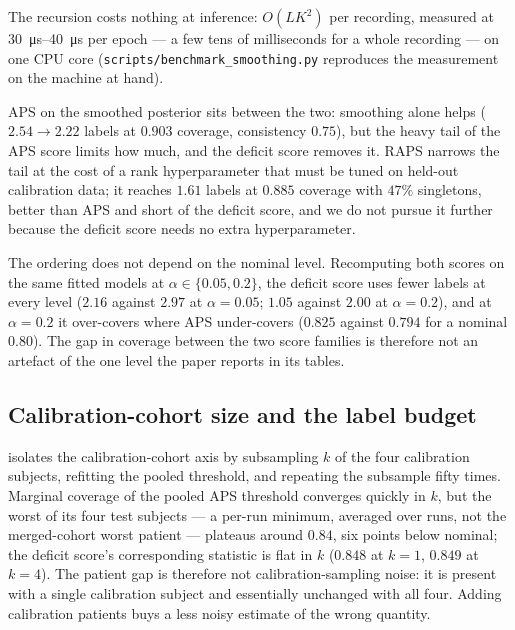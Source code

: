 

The recursion costs nothing at
inference: $O(LK^2)$ per recording, measured at
\SIrange{30}{40}{\micro\second} per epoch --- a few tens of milliseconds for
a whole recording --- on one CPU core (\texttt{scripts/benchmark\_smoothing.py}
reproduces the measurement on the machine at hand).

APS on the smoothed posterior sits between the two: smoothing alone helps
($2.54\to2.22$ labels at $0.903$ coverage, consistency $0.75$),
but the heavy tail of the APS score limits how much, and the deficit score
removes it. RAPS narrows the tail at the cost of a rank hyperparameter that
must be tuned on held-out calibration data; it reaches $1.61$ labels at
$0.885$ coverage with $47\%$ singletons, better than APS and short of the
deficit score, and we do not pursue it further because the deficit score needs
no extra hyperparameter.

The ordering does not depend on the nominal level. Recomputing both scores on
the same fitted models at $\alpha\in\{0.05,0.2\}$, the deficit score uses
fewer labels at every level ($2.16$ against $2.97$ at $\alpha=0.05$; $1.05$
against $2.00$ at $\alpha=0.2$), and at $\alpha=0.2$ it over-covers where APS
under-covers ($0.825$ against $0.794$ for a nominal $0.80$). The gap in
coverage between the two score families is therefore not an artefact of the
one level the paper reports in its tables.

\subsection{Calibration-cohort size and the label budget}
\label{sec:results-cohort-size}

 isolates the calibration-cohort axis by subsampling
$k$ of the four calibration subjects, refitting the pooled threshold, and
repeating the subsample fifty times. Marginal coverage of the pooled APS
threshold converges quickly in $k$, but the worst of its four test subjects
--- a per-run minimum, averaged over runs, not the merged-cohort worst
patient --- plateaus around $0.84$, six points below nominal; the deficit
score's corresponding statistic is flat in $k$ ($0.848$ at $k=1$, $0.849$ at
$k=4$). The patient gap is therefore not calibration-sampling noise: it is
present with a single calibration subject and essentially unchanged with all
four. Adding calibration patients buys a less noisy estimate of the wrong
quantity.

